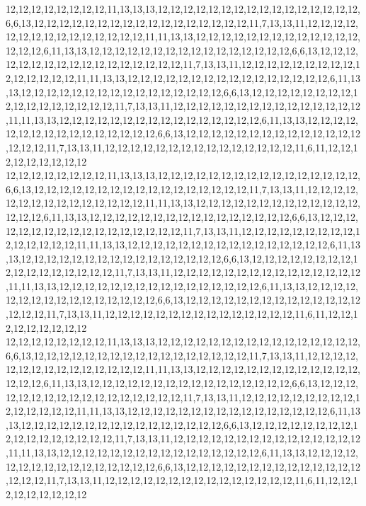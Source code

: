 12,12,12,12,12,12,12,12,11,13,13,13,12,12,12,12,12,12,12,12,12,12,12,12,12,12,12,12,6,6,13,12,12,12,12,12,12,12,12,12,12,12,12,12,12,12,12,12,11,7,13,13,11,12,12,12,12,12,12,12,12,12,12,12,12,12,12,12,11,11,13,13,12,12,12,12,12,12,12,12,12,12,12,12,12,12,12,12,6,11,13,13,12,12,12,12,12,12,12,12,12,12,12,12,12,12,12,12,6,6,13,12,12,12,12,12,12,12,12,12,12,12,12,12,12,12,12,12,11,7,13,13,11,12,12,12,12,12,12,12,12,12,12,12,12,12,12,12,11,11,13,13,12,12,12,12,12,12,12,12,12,12,12,12,12,12,12,12,6,11,13,13,12,12,12,12,12,12,12,12,12,12,12,12,12,12,12,12,6,6,13,12,12,12,12,12,12,12,12,12,12,12,12,12,12,12,12,12,11,7,13,13,11,12,12,12,12,12,12,12,12,12,12,12,12,12,12,12,11,11,13,13,12,12,12,12,12,12,12,12,12,12,12,12,12,12,12,12,6,11,13,13,12,12,12,12,12,12,12,12,12,12,12,12,12,12,12,12,6,6,13,12,12,12,12,12,12,12,12,12,12,12,12,12,12,12,12,12,11,7,13,13,11,12,12,12,12,12,12,12,12,12,12,12,12,12,12,12,11,6,11,12,12,12,12,12,12,12,12,12
12,12,12,12,12,12,12,12,11,13,13,13,12,12,12,12,12,12,12,12,12,12,12,12,12,12,12,12,6,6,13,12,12,12,12,12,12,12,12,12,12,12,12,12,12,12,12,12,11,7,13,13,11,12,12,12,12,12,12,12,12,12,12,12,12,12,12,12,11,11,13,13,12,12,12,12,12,12,12,12,12,12,12,12,12,12,12,12,6,11,13,13,12,12,12,12,12,12,12,12,12,12,12,12,12,12,12,12,6,6,13,12,12,12,12,12,12,12,12,12,12,12,12,12,12,12,12,12,11,7,13,13,11,12,12,12,12,12,12,12,12,12,12,12,12,12,12,12,11,11,13,13,12,12,12,12,12,12,12,12,12,12,12,12,12,12,12,12,6,11,13,13,12,12,12,12,12,12,12,12,12,12,12,12,12,12,12,12,6,6,13,12,12,12,12,12,12,12,12,12,12,12,12,12,12,12,12,12,11,7,13,13,11,12,12,12,12,12,12,12,12,12,12,12,12,12,12,12,11,11,13,13,12,12,12,12,12,12,12,12,12,12,12,12,12,12,12,12,6,11,13,13,12,12,12,12,12,12,12,12,12,12,12,12,12,12,12,12,6,6,13,12,12,12,12,12,12,12,12,12,12,12,12,12,12,12,12,12,11,7,13,13,11,12,12,12,12,12,12,12,12,12,12,12,12,12,12,12,11,6,11,12,12,12,12,12,12,12,12,12
12,12,12,12,12,12,12,12,11,13,13,13,12,12,12,12,12,12,12,12,12,12,12,12,12,12,12,12,6,6,13,12,12,12,12,12,12,12,12,12,12,12,12,12,12,12,12,12,11,7,13,13,11,12,12,12,12,12,12,12,12,12,12,12,12,12,12,12,11,11,13,13,12,12,12,12,12,12,12,12,12,12,12,12,12,12,12,12,6,11,13,13,12,12,12,12,12,12,12,12,12,12,12,12,12,12,12,12,6,6,13,12,12,12,12,12,12,12,12,12,12,12,12,12,12,12,12,12,11,7,13,13,11,12,12,12,12,12,12,12,12,12,12,12,12,12,12,12,11,11,13,13,12,12,12,12,12,12,12,12,12,12,12,12,12,12,12,12,6,11,13,13,12,12,12,12,12,12,12,12,12,12,12,12,12,12,12,12,6,6,13,12,12,12,12,12,12,12,12,12,12,12,12,12,12,12,12,12,11,7,13,13,11,12,12,12,12,12,12,12,12,12,12,12,12,12,12,12,11,11,13,13,12,12,12,12,12,12,12,12,12,12,12,12,12,12,12,12,6,11,13,13,12,12,12,12,12,12,12,12,12,12,12,12,12,12,12,12,6,6,13,12,12,12,12,12,12,12,12,12,12,12,12,12,12,12,12,12,11,7,13,13,11,12,12,12,12,12,12,12,12,12,12,12,12,12,12,12,11,6,11,12,12,12,12,12,12,12,12,12
